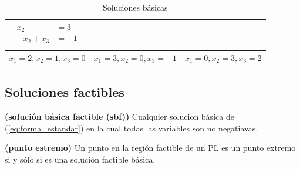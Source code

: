 \documentclass[../main.tex]{subfiles}
\begin{document}
\begin{example}
\begin{table}[h]
\begin{center}
\begin{tabular}{|c|c|c|}
\begin{minipage}{.3\textwidth}
\begin{equation*}
                                \begin{aligned}
                                    x_2 &= 3\\
                                    -x_2 +x_3 &= -1 \\
                                \end{aligned}
                            \end{equation*}
                        \end{minipage} \\ \hline
                        $x_1 = 2, x_2 = 1, x_3 = 0$ & $x_1 = 3, x_2 = 0, x_3 = -1$ & $x_1 = 0, x_2 = 3, x_3 = 2$ \\ \hline
                    \end{tabular}
                \end{center}
                \caption{Soluciones básicas}
            \end{table}
            \label{table:ejemplo_soluciones_básicas}
        \end{example}
        
    \subsection{Soluciones factibles}    
        \begin{definition} \textbf{(solución básica factible (sbf))}
            Cualquier solucion básica de (\ref{eq:forma_estandar}) en la cual todas las variables son no negatiavas.
        \end{definition}

        \begin{definition} \textbf{(punto estremo)}
            Un punto en la región factible de un PL es un punto extremo si y sólo si es una solución factible básica. 
        \end{definition}
\end{document}
